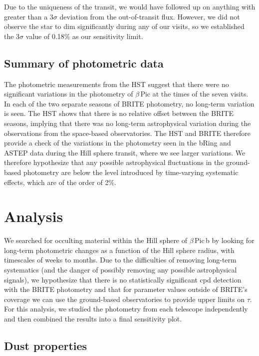 \documentclass[longauth]{aa} %
\newcommand{\bpb}{$\beta$\,Pic\,b}
\newcommand{\bp}{$\beta$\,Pic}
\begin{document}
Due to the uniqueness of the transit, we would have followed up on anything with greater than a 3$\sigma$ deviation from the out-of-transit flux.
%
However, we did not observe the star to dim significantly during any of our visits, so we established the 3$\sigma$ value of 0.18\% as our sensitivity limit.

\subsection{Summary of photometric data}

The photometric measurements from the HST suggest that there were no significant variations in the photometry of \bp{} at the times of the seven visits.
%
In each of the two separate seasons of BRITE photometry, no long-term variation is seen.
%
The HST shows that there is no relative offset between the BRITE seasons, implying that there was no long-term astrophysical variation during the observations from the space-based observatories.
%
%
The HST and BRITE therefore provide a check of the variations in the photometry seen in the bRing and ASTEP data during the Hill sphere transit, where we see larger variations.
%
We therefore hypothesize that any possible astrophysical fluctuations in the ground-based photometry are below the level introduced by time-varying systematic effects, which are of the order of 2\%.

\section{Analysis}\label{sec:analysis}

We searched for occulting material within the Hill sphere of \bpb{} by looking for long-term photometric changes as a function of the Hill sphere radius, with timescales of weeks to months.
%
Due to the difficulties of removing long-term systematics (and the danger of possibly removing any possible astrophysical signals), we hypothesize that there is no statistically significant \ac{cpd} detection with the BRITE photometry and that for parameter values outside of BRITE's coverage we can use the ground-based observatories to provide upper limits on $\tau$.
%
For this analysis, we studied the photometry from each telescope independently and then combined the results into a final sensitivity plot.

\subsection{Dust properties}\label{dust}
\end{document}
